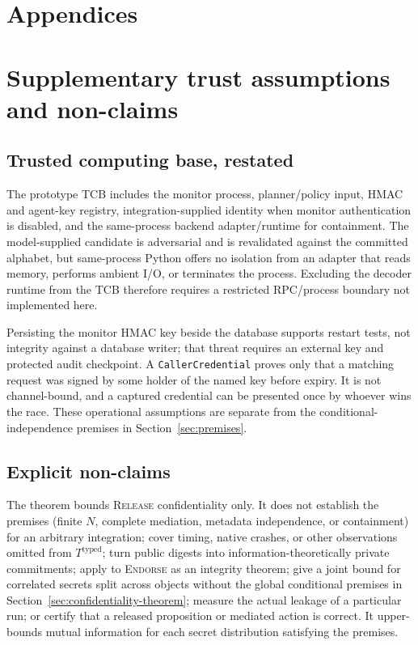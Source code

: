 \documentclass[conference,compsoc]{IEEEtran}
\begin{document}
\FloatBarrier
\clearpage



\appendices
\section*{Appendices}


\section{Supplementary trust assumptions and non-claims}
\label{app:trust-assumptions}

\subsection{Trusted computing base, restated}
The prototype TCB includes the monitor process, planner/policy input, HMAC
and agent-key registry, integration-supplied identity when monitor
authentication is disabled, and the same-process backend adapter/runtime
for containment. The model-supplied candidate is adversarial and is
revalidated against the committed alphabet, but same-process Python offers
no isolation from an adapter that reads memory, performs ambient I/O, or
terminates the process. Excluding the decoder runtime from the TCB therefore
requires a restricted RPC/process boundary not implemented here.

Persisting the monitor HMAC key beside the database supports restart tests,
not integrity against a database writer; that threat requires an external
key and protected audit checkpoint. A \texttt{CallerCredential} proves only
that a matching request was signed by some holder of the named key before
expiry. It is not channel-bound, and a captured credential can be presented
once by whoever wins the race. These operational assumptions are separate
from the conditional-independence premises in Section~\ref{sec:premises}.

\subsection{Explicit non-claims}
The theorem bounds \textsc{Release} confidentiality only. It does not
establish the premises (finite $N$, complete mediation, metadata
independence, or containment) for an arbitrary integration; cover timing,
native crashes, or other observations omitted from $T^{\mathrm{typed}}$;
turn public digests into information-theoretically private commitments;
apply to \textsc{Endorse} as an integrity theorem; give a joint bound for
correlated secrets split across objects without the global conditional premises in Section~\ref{sec:confidentiality-theorem}; measure the actual leakage of a particular run; or certify
that a released proposition or mediated action is correct. It upper-bounds
mutual information for each secret distribution satisfying the premises.
\end{document}
